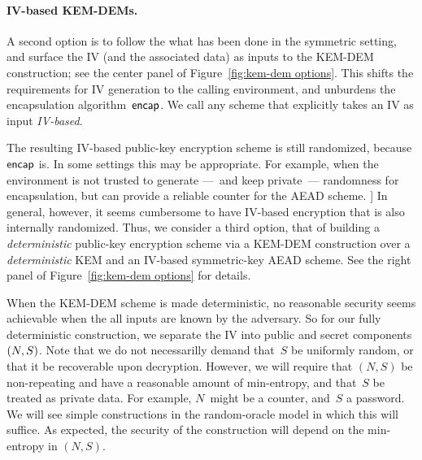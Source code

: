 \paragraph{IV-based KEM-DEMs. }
A second option is to follow the what has been done in the symmetric setting, and surface the IV (and the associated data) as inputs to the KEM-DEM construction; see the center panel of Figure~\ref{fig:kem-dem options}.  
This shifts the requirements for IV generation to the calling environment, and unburdens the encapsulation algorithm~$\mathsf{encap}$.  We call any scheme that explicitly takes an IV as input \emph{IV-based}.  

The resulting IV-based public-key encryption scheme is still randomized, because $\mathsf{encap}$ is.  In some settings this may be appropriate.  For example, when the environment is not trusted to generate ---~and keep private~--- randomness for encapsulation, but can provide a reliable counter for the AEAD scheme.  ]  In general, however, it seems cumbersome to have IV-based encryption that is also internally randomized.  
Thus, we consider a third option, that of building a \emph{deterministic} public-key encryption scheme via a KEM-DEM construction over a \emph{deterministic} KEM and an IV-based symmetric-key AEAD scheme.  See the right panel of Figure~\ref{fig:kem-dem options} for details.  

When the KEM-DEM scheme is made deterministic, no reasonable security seems achievable when the all inputs are known by the adversary.  So for our fully deterministic construction, we separate the IV into public and secret components $(N,S)$.   
Note that we do not necessarilly demand that~$S$ be uniformly random, or that it be recoverable upon decryption.  However, we will require that $(N,S)$ be non-repeating and have a reasonable amount of min-entropy, and that~$S$ be treated as private data.  For example, $N$~might be a counter, and~$S$ a password.  We will see simple constructions in the random-oracle model in which this will suffice. As expected, the security of the construction will depend on the min-entropy in $(N,S)$. 


